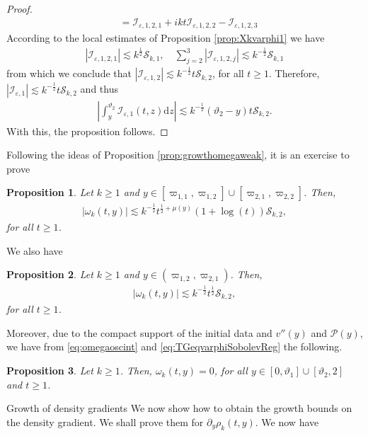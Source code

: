 \documentclass[11pt,reqno]{amsproc}
\makeatletter
\renewcommand\subsection{\@startsection{subsection}{2}%
\normalparindent{.5\linespacing\@plus.7\linespacing}{-.5em}
{\normalfont\bfseries}}
\newtheorem{proposition}{Proposition}[section]
\theoremstyle{definition}
\numberwithin{equation}{section}
\newcommand{\cI}{{\mathcal I}}
\newcommand{\cS}{{\mathcal S}}
\renewcommand{\d}{\mathrm{d}}
\newcommand{\ep}{\varepsilon}
\renewcommand{\P}{{\mathcal{P}}}
\makeatother
\begin{document}
\begin{proof}
\begin{align*}
&= \cI_{\ep,1,2,1} + ikt \cI_{\ep,1,2,2} - \cI_{\ep,1,2,3}
\end{align*}
According to the local estimates of Proposition \ref{prop:Xkvarphi1} we have
\begin{align*}
\left| \cI_{\ep,1,2,1} \right|  \lesssim k^\frac12\cS_{k,1}, \quad \sum_{j=2}^3\left| \cI_{\ep,1,2,j} \right| \lesssim k^{-\frac12}\cS_{k,1}
\end{align*}
from which we conclude that $\left| \cI_{\ep,1,2} \right| \lesssim k^{-\frac12}t \cS_{k,2}$, for all $t\geq 1$. Therefore, $\left| \cI_{\ep,1} \right| \lesssim k^{-\frac12} t \cS_{k,2}$ and thus
\begin{align*}
\left| \int_y^{\vartheta_2} \cI_{\ep,1}(t,z) \d z \right| \lesssim k^{-\frac12}(\vartheta_2-y) t \cS_{k,2}.
\end{align*}
With this, the proposition follows.
\end{proof}

Following the ideas of Proposition \ref{prop:growthomegaweak}, it is an exercise to prove

\begin{proposition}\label{prop:growthomegamild}
Let $k\geq 1$ and $y\in [\varpi_{1,1},\varpi_{1,2}]\cup [\varpi_{2,1},\varpi_{2,2}]$. Then,
\begin{align*}
|\omega_k(t,y)| \lesssim k^{-\frac12}t^{\frac12+\mu(y)}(1+\log(t))\cS_{k,2},
\end{align*}
for all $t\geq 1$.
\end{proposition}
We also have
\begin{proposition}\label{prop:growthomegastrong}
Let $k\geq 1$ and $y\in (\varpi_{1,2}, \varpi_{2,1})$. Then,
\begin{align*}
|\omega_k(t,y)| \lesssim k^{-\frac12}t^{\frac12}\cS_{k,2},
\end{align*}
for all $t\geq 1$.
\end{proposition}

Moreover, due to the compact support of the initial data and $v''(y)$ and $\P(y)$, we have from \eqref{eq:omegaoscint} and \eqref{eq:TGeqvarphiSobolevReg} the following.
\begin{proposition}\label{prop:growthomeganonstrat}
Let $k\geq 1$. Then, $\omega_k(t,y) =0$, for all $y\in [0,\vartheta_1] \cup [\vartheta_2,2]$ and $t\geq 1$.
\end{proposition}

\subsection{Growth of density gradients}
We now show how to obtain the growth bounds on the density gradient. We shall prove them for $\partial_y\rho_k(t,y)$. We now have
\end{document}
